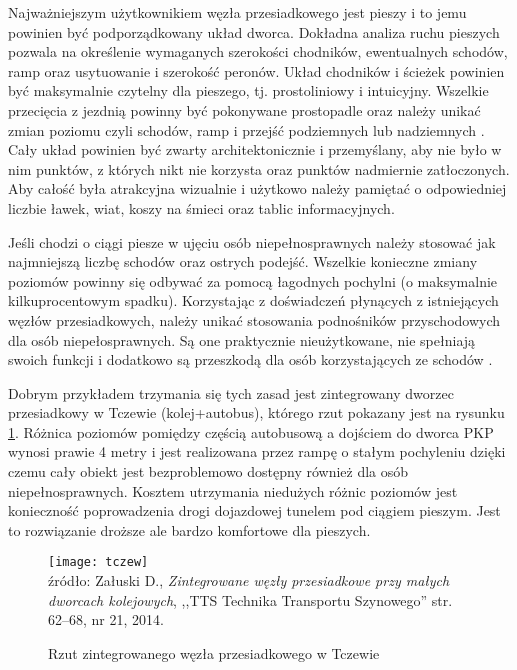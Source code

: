 \documentclass[twoside,12pt]{article}
\begin{document}
	Najważniejszym użytkownikiem węzła przesiadkowego jest pieszy i to jemu powinien być podporządkowany układ dworca. Dokładna analiza ruchu pieszych pozwala na określenie wymaganych szerokości chodników, ewentualnych schodów, ramp oraz usytuowanie i szerokość peronów. Układ chodników i ścieżek powinien być maksymalnie czytelny dla pieszego, tj. prostoliniowy i intuicyjny. Wszelkie przecięcia z jezdnią powinny być pokonywane prostopadle oraz należy unikać zmian poziomu czyli schodów, ramp i przejść podziemnych lub nadziemnych  \cite{zaluski}. Cały układ powinien być zwarty architektonicznie i przemyślany, aby nie było w nim punktów, z których nikt nie korzysta oraz punktów nadmiernie zatłoczonych. Aby całość była atrakcyjna wizualnie i użytkowo należy pamiętać o odpowiedniej liczbie ławek, wiat, koszy na śmieci oraz tablic informacyjnych. 
	
	Jeśli chodzi o ciągi piesze w ujęciu osób niepełnosprawnych należy stosować jak najmniejszą liczbę schodów oraz ostrych podejść. Wszelkie konieczne zmiany poziomów powinny się odbywać za pomocą łagodnych pochylni (o maksymalnie kilkuprocentowym spadku). Korzystając z doświadczeń płynących z istniejących węzłów przesiadkowych, należy unikać stosowania podnośników przyschodowych dla osób niepełosprawnych. Są one praktycznie nieużytkowane, nie spełniają swoich funkcji i dodatkowo są przeszkodą dla osób korzystających ze schodów \cite{zaluski}. 
	
	Dobrym przykładem trzymania się tych zasad jest zintegrowany dworzec przesiadkowy w Tczewie (kolej+autobus), którego rzut pokazany jest na rysunku \ref{tczew}. Różnica poziomów pomiędzy częścią autobusową a dojściem do dworca PKP wynosi prawie 4 metry i jest realizowana przez rampę o stałym pochyleniu dzięki czemu cały obiekt jest bezproblemowo dostępny również dla osób niepełnosprawnych. Kosztem utrzymania niedużych różnic poziomów jest konieczność poprowadzenia drogi dojazdowej tunelem pod ciągiem pieszym. Jest to rozwiązanie droższe ale bardzo komfortowe dla pieszych.
	
	\begin{figure}[H]
		\centering
		\caption{Rzut zintegrowanego węzła przesiadkowego w Tczewie}
		\texttt{[image: tczew]}\\
		\footnotesize{źródło: Załuski D., \emph{Zintegrowane węzły przesiadkowe przy małych dworcach kolejowych}, ,,TTS Technika Transportu Szynowego'' str. 62--68, nr 21, 2014. \cite{zaluski}}
		\label{tczew}
	\end{figure}
	
\end{document}
